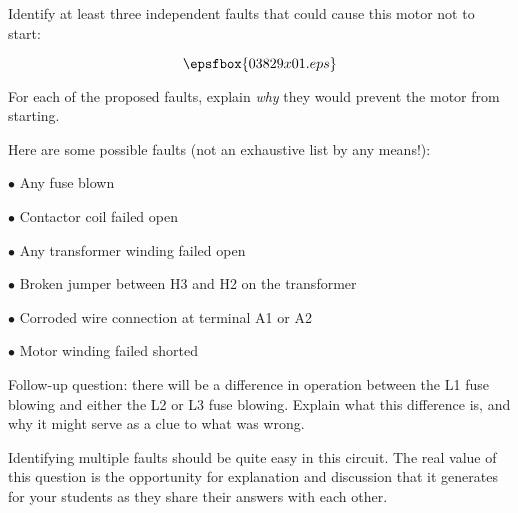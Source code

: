 

Identify at least three independent faults that could cause this motor not to start:

$$\epsfbox{03829x01.eps}$$

For each of the proposed faults, explain {\it why} they would prevent the motor from starting.







Here are some possible faults (not an exhaustive list by any means!):

\medskip
\item{$\bullet$} Any fuse blown
\item{$\bullet$} Contactor coil failed open
\item{$\bullet$} Any transformer winding failed open
\item{$\bullet$} Broken jumper between H3 and H2 on the transformer
\item{$\bullet$} Corroded wire connection at terminal A1 or A2
\item{$\bullet$} Motor winding failed shorted
\medskip

\vskip 10pt

Follow-up question: there will be a difference in operation between the L1 fuse blowing and either the L2 or L3 fuse blowing.  Explain what this difference is, and why it might serve as a clue to what was wrong.







Identifying multiple faults should be quite easy in this circuit.  The real value of this question is the opportunity for explanation and discussion that it generates for your students as they share their answers with each other.





